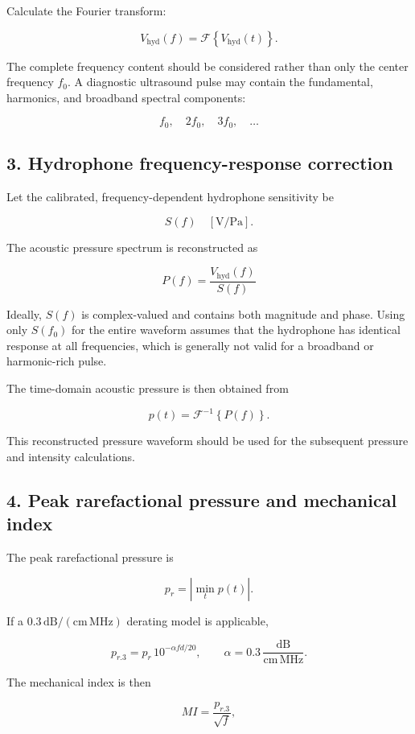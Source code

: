 \documentclass[11pt,a4paper]{article}
\begin{document}
Calculate the Fourier transform:

\[
V_{\mathrm{hyd}}(f)
=
\mathcal{F}\left\{V_{\mathrm{hyd}}(t)\right\}.
\]

The complete frequency content should be considered rather than only the
center frequency \(f_0\). A diagnostic ultrasound pulse may contain the
fundamental, harmonics, and broadband spectral components:

\[
f_0,\quad 2f_0,\quad 3f_0,\quad \ldots
\]

\subsection*{3. Hydrophone frequency-response correction}

Let the calibrated, frequency-dependent hydrophone sensitivity be

\[
S(f)\quad [\mathrm{V/Pa}].
\]

The acoustic pressure spectrum is reconstructed as

\[
\boxed{
P(f)=\frac{V_{\mathrm{hyd}}(f)}{S(f)}
}
\]

Ideally, \(S(f)\) is complex-valued and contains both magnitude and phase.
Using only \(S(f_0)\) for the entire waveform assumes that the hydrophone
has identical response at all frequencies, which is generally not valid for
a broadband or harmonic-rich pulse.

The time-domain acoustic pressure is then obtained from

\[
\boxed{
p(t)=\mathcal{F}^{-1}\left\{P(f)\right\}.
}
\]

This reconstructed pressure waveform should be used for the subsequent
pressure and intensity calculations.

\subsection*{4. Peak rarefactional pressure and mechanical index}

The peak rarefactional pressure is

\[
\boxed{
p_r=\left|\min_t p(t)\right|.
}
\]

If a \(0.3\,\mathrm{dB/(cm\,MHz)}\) derating model is applicable,

\[
\boxed{
p_{r.3}
=
p_r\,10^{-\alpha f d/20},
\qquad
\alpha=0.3\,
\frac{\mathrm{dB}}{\mathrm{cm\,MHz}}.
}
\]

The mechanical index is then

\[
\boxed{
MI=\frac{p_{r.3}}{\sqrt{f}},
}
\]
\end{document}
